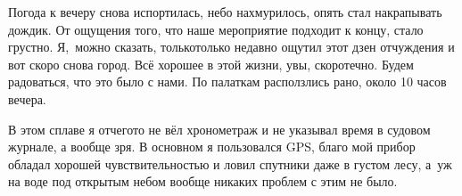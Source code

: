 Погода к вечеру снова испортилась, небо нахмурилось, опять стал накрапывать дождик. От ощущения того, что наше мероприятие подходит к концу, стало грустно. Я,~можно сказать, только\sdash только недавно ощутил этот дзен отчуждения и вот скоро снова город. Всё хорошее в этой жизни, увы, скоротечно. Будем радоваться, что это было с нами. По палаткам расползлись рано, около 10 часов вечера. 

В этом сплаве я отчего\sdash то не вёл хронометраж и не указывал время в судовом журнале, а вообще зря. В основном я пользовался GPS, благо мой прибор обладал хорошей чувствительностью и ловил спутники даже в густом лесу, а~уж на воде под открытым небом вообще никаких проблем с этим не было.

\begin{center}
\end{center}
